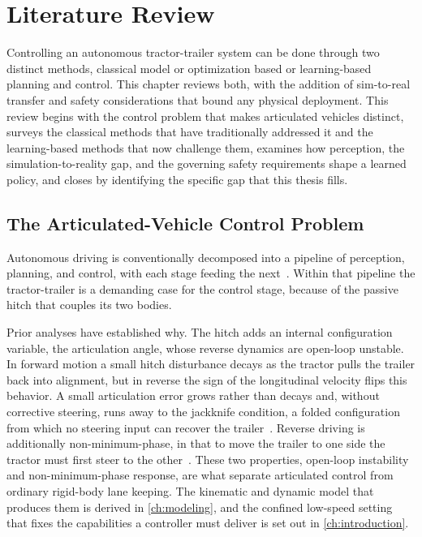 \chapter{Literature Review}
\label{ch:literature_review}

Controlling an autonomous tractor-trailer system can be done through two distinct methods, classical model or optimization based or learning-based planning and control. This chapter reviews both, with the addition of sim-to-real transfer and safety considerations that bound any physical deployment. This review begins with the control problem that makes articulated vehicles distinct, surveys the classical methods that have traditionally addressed it and the learning-based methods that now challenge them, examines how perception, the simulation-to-reality gap, and the governing safety requirements shape a learned policy, and closes by identifying the specific gap that this thesis fills.

\section{The Articulated-Vehicle Control Problem}

Autonomous driving is conventionally decomposed into a pipeline of perception, planning, and control, with each stage feeding the next~\cite{pendleton2017survey}. Within that pipeline the tractor-trailer is a demanding case for the control stage, because of the passive hitch that couples its two bodies.

Prior analyses have established why. The hitch adds an internal configuration variable, the articulation angle, whose reverse dynamics are open-loop unstable. In forward motion a small hitch disturbance decays as the tractor pulls the trailer back into alignment, but in reverse the sign of the longitudinal velocity flips this behavior. A small articulation error grows rather than decays and, without corrective steering, runs away to the jackknife condition, a folded configuration from which no steering input can recover the trailer~\cite{fancher2007directional}. Reverse driving is additionally non-minimum-phase, in that to move the trailer to one side the tractor must first steer to the other~\cite{altafini2001reversing}. These two properties, open-loop instability and non-minimum-phase response, are what separate articulated control from ordinary rigid-body lane keeping. The kinematic and dynamic model that produces them is derived in \cref{ch:modeling}, and the confined low-speed setting that fixes the capabilities a controller must deliver is set out in \cref{ch:introduction}.

